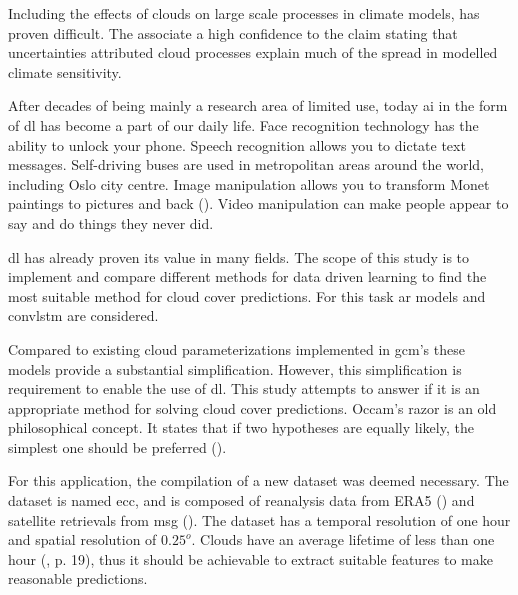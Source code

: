 Including the effects of clouds on large scale processes in climate models, has proven difficult. The  associate a high confidence to the claim stating that uncertainties attributed cloud processes explain much of the spread in modelled climate sensitivity. 

After decades of being mainly a research area of limited use, today \acrfull{ai} in the form of \acrfull{dl} has become a part of our daily life. Face recognition technology has the ability to unlock your phone. Speech recognition allows you to dictate text messages. %
Self-driving buses are used in metropolitan areas around the world, including Oslo city centre.  %
Image manipulation allows you to transform Monet paintings to pictures and back (\cite{zhu2017_cycleGAN_monet_zebra}). Video manipulation can make people appear to say and do things they never did. 

\acrshort{dl} has already proven its value in many fields. The scope of this study is to implement and compare different methods for data driven learning to find the most suitable method for cloud cover predictions. For this task \acrfull{ar} models and \acrfull{convlstm} are considered. 

Compared to existing cloud parameterizations implemented in \acrshort{gcm}'s these models provide a substantial simplification.
However, this simplification is requirement to enable the use of \acrshort{dl}. This study attempts to answer if it is an appropriate method for solving cloud cover predictions.
Occam's razor is an old philosophical concept. It states that if two hypotheses are equally likely, the simplest one should be preferred (\cite{noauthor_occams_nodate}). 

For this application, the compilation of a new dataset was deemed necessary. The dataset is named \acrfull{ecc}, and is composed of reanalysis data from ERA5 (\cite{Hersbach2018OperationalStatus}) and satellite retrievals from \acrfull{msg} (\cite{Schmetz_meteosat_intro}).
The dataset has a temporal resolution of one hour and spatial resolution of $0.25^o$. Clouds have an average lifetime of less than one hour (\cite{lohmann2016}, p. 19), thus it should be achievable to extract suitable features to make reasonable predictions. 

